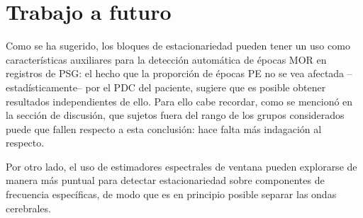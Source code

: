 
\section{Trabajo a futuro}

Como se ha sugerido, los bloques de estacionariedad pueden tener un uso como 
caracter\'isticas auxiliares
para la detecci\'on autom\'atica de \'epocas MOR en registros de PSG: el hecho que la proporci\'on
de \'epocas PE no se vea afectada --estad\'isticamente-- por el PDC del paciente, sugiere que es
posible obtener resultados independientes de ello. Para ello cabe recordar, como se mencion\'o 
en la secci\'on de discusi\'on, que sujetos fuera del rango de los grupos considerados puede
que fallen respecto a esta conclusi\'on: hace falta m\'as indagaci\'on al respecto. 

Por otro lado, el uso de estimadores espectrales de ventana pueden explorarse de manera m\'as
puntual para detectar estacionariedad sobre componentes de frecuencia espec\'ificas, de modo
que es en principio posible separar las ondas cerebrales.

